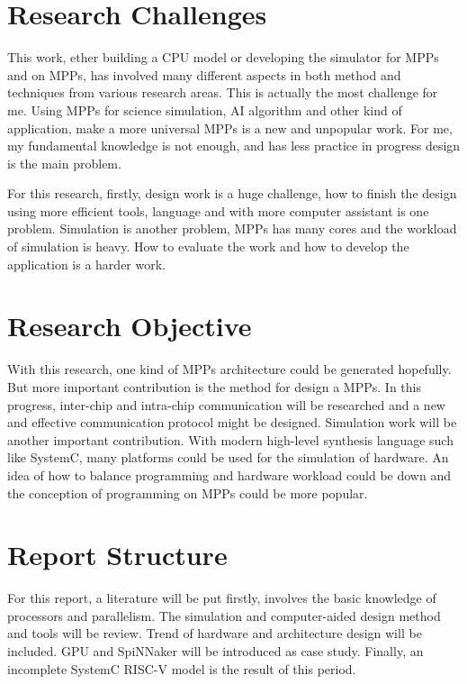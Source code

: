 \section{Research Challenges}

This work, ether building a CPU model or developing the simulator for MPPs and on MPPs, has involved many different aspects in both method and techniques from various research areas. This is actually the most challenge for me. \cite{ZARRIN201707Manycore}
Using MPPs for science simulation, AI algorithm and other kind of application, make a more universal MPPs is a new and unpopular work. For me, my fundamental knowledge is not enough, and has less practice in progress design is the main problem.
\par 
For this research, firstly, design work is a huge challenge, how to finish the design using more efficient tools, language and with more computer assistant is one problem. Simulation is another problem, MPPs has many cores and the workload of simulation is heavy. How to evaluate the work and how to develop the application is a harder work. 

\section{Research Objective}
With this research, one kind of MPPs architecture could be generated hopefully. But more important contribution is the method for design a MPPs. In this progress, inter-chip and intra-chip communication will be researched and a new and effective communication protocol might be designed. Simulation work will be another important contribution. With modern high-level synthesis language such like SystemC, many platforms could be used for the simulation of hardware. An idea of how to balance programming and hardware workload could be down and the conception of programming on MPPs could be more popular.

\section{Report Structure}
For this report, a literature will be put firstly, involves the basic knowledge of processors and parallelism. The simulation and computer-aided design method and tools will be review. Trend of hardware and architecture design will be included. GPU and SpiNNaker will be introduced as case study. Finally, an incomplete SystemC RISC-V model is the result of this period. 
